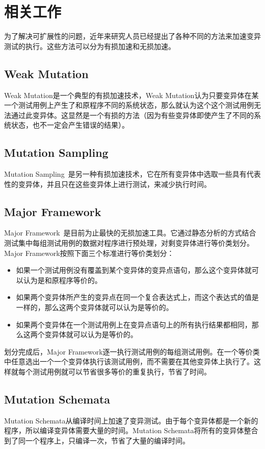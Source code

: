 \documentclass[nofonts]{ctexrep}
\begin{document}
\section{相关工作}
为了解决可扩展性的问题，近年来研究人员已经提出了各种不同的方法来加速变异测试的执行。这些方法可以分为有损加速和无损加速。

\subsection{Weak Mutation}
Weak Mutation\cite{howden1982weak}是一个典型的有损加速技术，Weak Mutation认为只要变异体在某一个测试用例上产生了和原程序不同的系统状态，那么就认为这个这个测试用例无法通过此变异体。这显然是一个有损的方法（因为有些变异体即使产生了不同的系统状态，也不一定会产生错误的结果）。
\subsection{Mutation Sampling}
Mutation Sampling~\cite{wong1995reducing}是另一种有损加速技术，它在所有变异体中选取一些具有代表性的变异体，并且只在这些变异体上进行测试，来减少执行时间。
\subsection{Major Framework}
Major Framework~\cite{just2014efficient}是目前为止最快的无损加速工具。它通过静态分析的方式结合测试集中每组测试用例的数据对程序进行预处理，对剩变异体进行等价类划分。Major Framework按照下面三个标准进行等价类划分：

\begin{itemize}
\item 如果一个测试用例没有覆盖到某个变异体的变异点语句，那么这个变异体就可以认为是和原程序等价的。
\item 如果两个变异体所产生的变异点在同一个复合表达式上，而这个表达式的值是一样的，那么这两个变异体就可以认为是等价的。
\item 如果两个变异体在一个测试用例上在变异点语句上的所有执行结果都相同，那么这两个变异体就可以认为是等价的。
\end{itemize}

划分完成后，Major Framework逐一执行测试用例的每组测试用例。在一个等价类中任意选出一个一个变异体执行该测试用例，而不需要在其他变异体上执行了。这样就每个测试用例就可以节省很多等价的重复执行，节省了时间。

\subsection{Mutation Schemata}
Mutation Schemata从编译时间上加速了变异测试。由于每个变异体都是一个新的程序，所以编译变异体需要大量的时间。Mutation Schemata将所有的变异体整合到了同一个程序上，只编译一次，节省了大量的编译时间。
\end{document}
